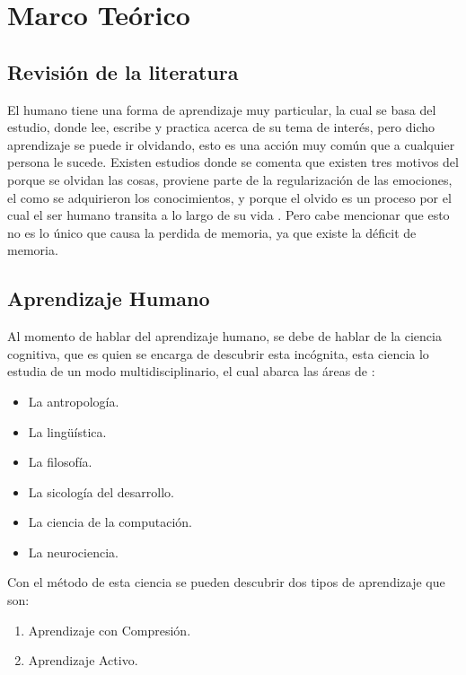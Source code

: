 \section{Marco Teórico}

    \subsection{Revisión de la literatura}
        El humano tiene una forma de aprendizaje muy particular, la cual se basa del estudio, donde lee, escribe y practica acerca de
        su tema de interés, pero dicho aprendizaje se puede ir olvidando, esto es una acción muy común que a cualquier persona le sucede.
        Existen estudios donde se comenta que existen tres motivos del porque se olvidan las cosas, proviene parte de la regularización de las emociones,
        el como se adquirieron los conocimientos, y porque el olvido es un proceso por el cual el ser humano transita a lo largo de su vida \cite{Nrby2015}. Pero cabe
        mencionar que esto no es lo único que causa la perdida de memoria, ya que existe la déficit de memoria. 

    \subsection{Aprendizaje Humano}
        Al momento de hablar del aprendizaje humano, se debe de hablar de la ciencia cognitiva, que es quien se encarga de descubrir esta incógnita,
        esta ciencia lo estudia de un modo multidisciplinario, el cual abarca las \'areas de \cite{bransford2000}: 
        \begin{itemize}
            \item La antropología.
            \item La lingüística.
            \item La filosofía.
            \item La sicología del desarrollo.
            \item La ciencia de la computación. 
            \item La neurociencia.
        \end{itemize}
        Con el método de esta ciencia se pueden descubrir dos tipos de aprendizaje que son:
        \begin{enumerate}
            \item Aprendizaje con Compresi\'on.
            \item Aprendizaje Activo.
        \end{enumerate}
